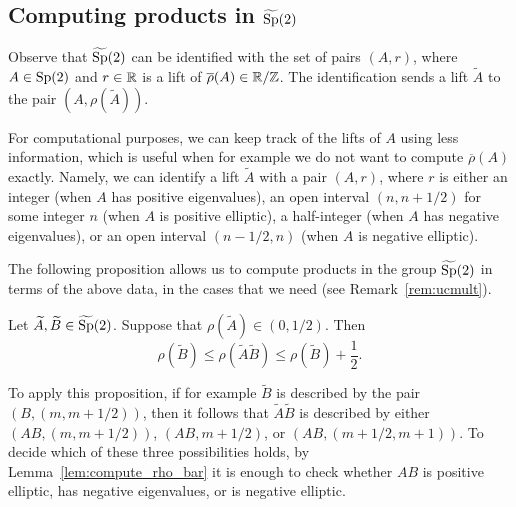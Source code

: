 \subsection{Computing products in $\widetilde{\text{Sp}}(2)$}
\label{subsec:computing_with_Sp2}

Observe that $\widetilde{\text{Sp}}(2)$ can be identified with the set of pairs $(A,r)$, where $A\in\text{Sp}(2)$ and $r\in{\mathbb R}$ is a lift of $\overline{\rho}(A)\in{\mathbb R}/{\mathbb Z}$. The identification sends a lift $\widetilde{A}$ to the pair $(A,\rho(\widetilde{A}))$.

For computational purposes, we can keep track of the lifts of $A$ using less information, which is useful when for example we do not want to compute $\overline{\rho}(A)$ exactly. Namely, we can identify a lift $\widetilde{A}$ with a pair $(A,r)$, where $r$ is either an integer (when $A$ has positive eigenvalues), an open interval $(n,n+1/2)$ for some integer $n$ (when $A$ is positive elliptic), a half-integer (when $A$ has negative eigenvalues), or an open interval $(n-1/2,n)$ (when $A$ is negative elliptic).

The following proposition allows us to compute products in the group $\widetilde{\text{Sp}}(2)$ in terms of the above data, in the cases that we need (see Remark~\ref{rem:ucmult}).

\begin{proposition}
\label{prop:ucmult}
Let $\widetilde{A},\widetilde{B} \in \widetilde{\text{Sp}}(2)$. Suppose that $\rho(\widetilde{A})\in(0,1/2)$. Then
\[
\rho(\widetilde{B}) \le \rho(\widetilde{A}\widetilde{B}) \le \rho(\widetilde{B}) + \frac{1}{2}.
\]
\end{proposition}

To apply this proposition, if for example $\widetilde{B}$ is described by the pair $(B,(m,m+1/2))$, then it follows that $\widetilde{A}\widetilde{B}$ is described by either $(AB,(m,m+1/2))$, $(AB,m+1/2)$, or $(AB,(m+1/2,m+1))$. To decide which of these three possibilities holds, by Lemma~\ref{lem:compute_rho_bar} it is enough to check whether $AB$ is positive elliptic, has negative eigenvalues, or is negative elliptic.

